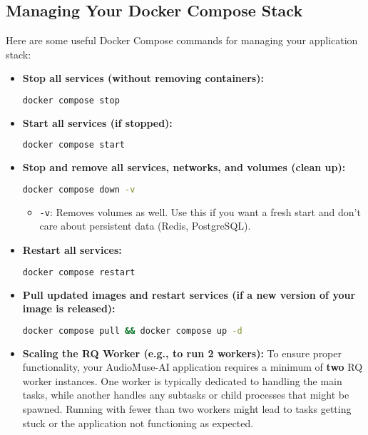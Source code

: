 \documentclass{article}
\begin{document}
\begin{enumerate}
\section*{Managing Your Docker Compose Stack}

Here are some useful Docker Compose commands for managing your application stack:

\begin{itemize}
    \item \textbf{Stop all services (without removing containers):}
    \begin{lstlisting}[language=bash, caption=Stop all services]
docker compose stop
    \end{lstlisting}

    \item \textbf{Start all services (if stopped):}
    \begin{lstlisting}[language=bash, caption=Start all services]
docker compose start
    \end{lstlisting}

    \item \textbf{Stop and remove all services, networks, and volumes (clean up):}
    \begin{lstlisting}[language=bash, caption=Stop and remove all services]
docker compose down -v
    \end{lstlisting}
    \begin{itemize}
        \item \texttt{-v}: Removes volumes as well. Use this if you want a fresh start and don't care about persistent data (Redis, PostgreSQL).
    \end{itemize}

    \item \textbf{Restart all services:}
    \begin{lstlisting}[language=bash, caption=Restart all services]
docker compose restart
    \end{lstlisting}

    \item \textbf{Pull updated images and restart services (if a new version of your image is released):}
    \begin{lstlisting}[language=bash, caption=Pull and restart services]
docker compose pull && docker compose up -d
    \end{lstlisting}

    \item \textbf{Scaling the RQ Worker (e.g., to run 2 workers):}
    To ensure proper functionality, your AudioMuse-AI application requires a minimum of \textbf{two} RQ worker instances. One worker is typically dedicated to handling the main tasks, while another handles any subtasks or child processes that might be spawned. Running with fewer than two workers might lead to tasks getting stuck or the application not functioning as expected.


\end{itemize}
\end{enumerate}
\end{document}
